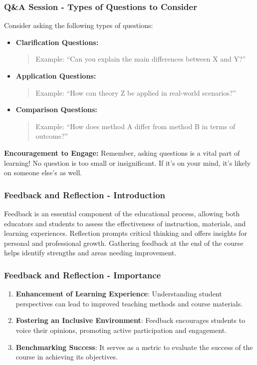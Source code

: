\documentclass[aspectratio=169]{beamer}
\begin{document}
\begin{frame}[fragile]
  \frametitle{Q\&A Session - Types of Questions to Consider}
  Consider asking the following types of questions:
  \begin{itemize}
    \item \textbf{Clarification Questions:}
      \begin{quote}
        Example: ``Can you explain the main differences between X and Y?'' 
      \end{quote}
    \item \textbf{Application Questions:}
      \begin{quote}
        Example: ``How can theory Z be applied in real-world scenarios?''
      \end{quote}
    \item \textbf{Comparison Questions:}
      \begin{quote}
        Example: ``How does method A differ from method B in terms of outcome?''
      \end{quote}
  \end{itemize}

  \textbf{Encouragement to Engage:}
  Remember, asking questions is a vital part of learning! No question is too small or insignificant. If it's on your mind, it's likely on someone else's as well.
\end{frame}

\begin{frame}[fragile]
    \frametitle{Feedback and Reflection - Introduction}
    Feedback is an essential component of the educational process, allowing both educators and students to assess the effectiveness of instruction, materials, and learning experiences. Reflection prompts critical thinking and offers insights for personal and professional growth. 
    Gathering feedback at the end of the course helps identify strengths and areas needing improvement.
\end{frame}

\begin{frame}[fragile]
    \frametitle{Feedback and Reflection - Importance}
    \begin{enumerate}
        \item \textbf{Enhancement of Learning Experience}: Understanding student perspectives can lead to improved teaching methods and course materials.
        \item \textbf{Fostering an Inclusive Environment}: Feedback encourages students to voice their opinions, promoting active participation and engagement.
        \item \textbf{Benchmarking Success}: It serves as a metric to evaluate the success of the course in achieving its objectives.
    \end{enumerate}
\end{frame}
\end{document}
